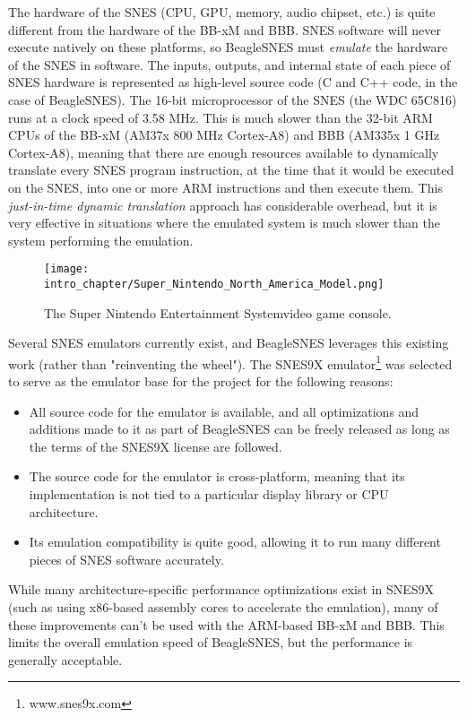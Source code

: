 The hardware of the SNES (CPU, GPU, memory, audio chipset, etc.) is quite different from the hardware of the BB-xM and BBB.  SNES software will never execute natively on these platforms, so BeagleSNES must \emph{emulate} the hardware of the SNES in software.  The inputs, outputs, and internal state of each piece of SNES hardware is represented as high-level source code (C and C++ code, in the case of BeagleSNES).  The 16-bit microprocessor of the SNES (the WDC 65C816) runs at a clock speed of 3.58 MHz.  This is much slower than the 32-bit ARM CPUs of the BB-xM (AM37x 800 MHz Cortex-A8) and BBB (AM335x 1 GHz Cortex-A8), meaning that there are enough resources available to dynamically translate every SNES program instruction, at the time that it would be executed on the SNES, into one or more ARM instructions and then execute them.  This \emph{just-in-time dynamic translation} approach has considerable overhead, but it is very effective in situations where the emulated system is much slower than the system performing the emulation.

\begin{figure}[h]
\texttt{[image: intro\_chapter/Super\_Nintendo\_North\_America\_Model.png]}
\caption{The Super Nintendo Entertainment System\textregistered video game console.}
\end{figure}

Several SNES emulators currently exist, and BeagleSNES leverages this existing work (rather than "reinventing the wheel").  The SNES9X emulator\footnote{www.snes9x.com} was selected to serve as the emulator base for the project for the following reasons:

\begin{itemize}
\item All source code for the emulator is available, and all optimizations and additions made to it as part of BeagleSNES can be freely released as long as the terms of the SNES9X license are followed.
\item The source code for the emulator is cross-platform, meaning that its implementation is not tied to a particular display library or CPU architecture.
\item Its emulation compatibility is quite good, allowing it to run many different pieces of SNES software accurately.
\end{itemize}

While many architecture-specific performance optimizations exist in SNES9X (such as using x86-based assembly cores to accelerate the emulation), many of these improvements can't be used with the ARM-based BB-xM and BBB.  This limits the overall emulation speed of BeagleSNES, but the performance is generally acceptable.  

